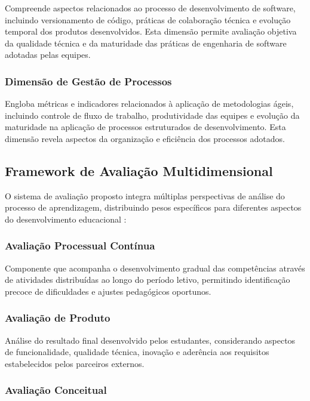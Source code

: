 \documentclass[12pt,a4paper]{article}
\renewcommand{\cite}[1]{}
\begin{document}
Compreende aspectos relacionados ao processo de desenvolvimento de software,
incluindo versionamento de código, práticas de colaboração técnica e evolução
temporal dos produtos desenvolvidos. Esta dimensão permite avaliação objetiva
da qualidade técnica e da maturidade das práticas de engenharia de software
adotadas pelas equipes.

\subsubsection{Dimensão de Gestão de Processos}

Engloba métricas e indicadores relacionados à aplicação de metodologias ágeis,
incluindo controle de fluxo de trabalho, produtividade das equipes e evolução
da maturidade na aplicação de processos estruturados de desenvolvimento. Esta
dimensão revela aspectos da organização e eficiência dos processos adotados.

\subsection{Framework de Avaliação Multidimensional}

O sistema de avaliação proposto integra múltiplas perspectivas de análise do
processo de aprendizagem, distribuindo pesos específicos para diferentes
aspectos do desenvolvimento educacional \cite{inteli2024}:

\subsubsection{Avaliação Processual Contínua}

Componente que acompanha o desenvolvimento gradual das competências através de
atividades distribuídas ao longo do período letivo, permitindo identificação
precoce de dificuldades e ajustes pedagógicos oportunos.

\subsubsection{Avaliação de Produto}

Análise do resultado final desenvolvido pelos estudantes, considerando aspectos
de funcionalidade, qualidade técnica, inovação e aderência aos requisitos
estabelecidos pelos parceiros externos.

\subsubsection{Avaliação Conceitual}
\end{document}
